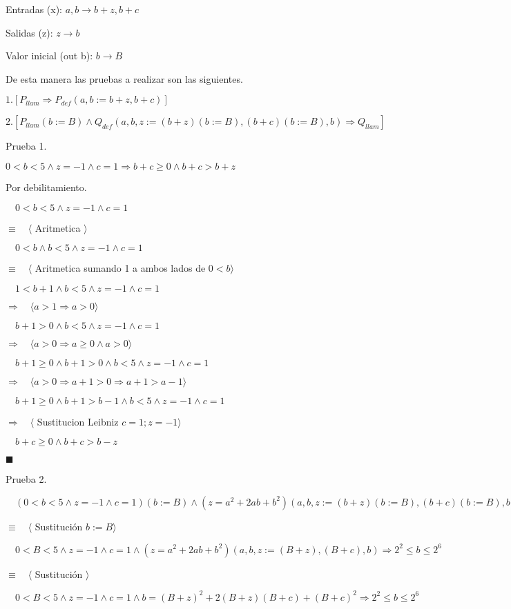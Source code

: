 \documentclass[hidelinks]{article}
\begin{document}
Entradas (x): $a,b \rightarrow b+z, b+c$ \par
Salidas (z): $z \rightarrow b$ \par
Valor inicial (out b): $b \rightarrow B$ \par

De esta manera las pruebas a realizar son las siguientes. \par

$1. [P_{llam} \Rightarrow P_{def}(a,b := b+z,b+c)]$ \par
$2. [P_{llam}(b := B) \land Q_{def}(a,b,z := (b+z)(b := B), (b+c)(b := B), b) \Rightarrow Q_{llam}]$ \par

Prueba 1. \par
$ 0 < b < 5 \land z = -1 \land c = 1 \Rightarrow b+c \geq 0 \land b+c > b+z$ \par

Por debilitamiento. \par

$ \quad 0 < b < 5 \land z = -1 \land c = 1$ \par
$\equiv \quad \langle$ Aritmetica $\rangle$ \par
$ \quad 0 < b \land b < 5 \land z = -1 \land c = 1$ \par
$\equiv \quad \langle$ Aritmetica sumando 1 a ambos lados de $ 0 < b \rangle$ \par
$ \quad 1 < b+1 \land b < 5 \land z = -1 \land c = 1$ \par
$\Rightarrow \quad \langle a > 1 \Rightarrow a > 0 \rangle$ \par
$ \quad b+1 > 0 \land b < 5 \land z = -1 \land c = 1$ \par
$\Rightarrow \quad \langle a > 0 \Rightarrow a \geq 0 \land a > 0 \rangle$ \par
$ \quad b+1 \geq 0 \land b+1 > 0 \land b < 5 \land z = -1 \land c = 1$ \par
$\Rightarrow \quad \langle a > 0 \Rightarrow a + 1 > 0 \Rightarrow a + 1 > a - 1  \rangle$ \par
$ \quad b+1 \geq 0 \land b+1 > b - 1 \land b < 5 \land z = -1 \land c = 1$ \par
$\Rightarrow \quad \langle$ Sustitucion Leibniz  $c = 1; z = -1\rangle$ \par
$ \quad b+c \geq 0 \land b+c > b - z$ \par

$\blacksquare$ \par
Prueba 2. \par
$\quad (0 < b < 5 \land z = -1 \land c = 1)(b := B) \land (z = a^2 + 2ab +b^2)(a,b,z := (b+z)(b := B), (b+c)(b := B), b) \Rightarrow 2^2 \leq b \leq 2^6$ \par
$\equiv \quad \langle$ Sustitución $ b := B\rangle$ \par
$\quad 0 < B < 5 \land z = -1 \land c = 1 \land (z = a^2 + 2ab +b^2)(a,b,z := (B+z), (B+c), b) \Rightarrow 2^2 \leq b \leq 2^6$ \par
$\equiv \quad \langle$ Sustitución $ \rangle$ \par
$\quad 0 < B < 5 \land z = -1 \land c = 1 \land b = (B+z)^2 + 2(B+z)(B+c) +(B+c)^2 \Rightarrow 2^2 \leq b \leq 2^6$ \par
\end{document}
